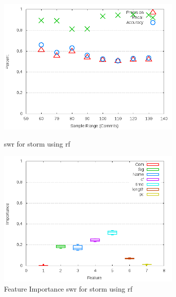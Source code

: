 \begin{figure}[!ht]
    \centering
        \includegraphics[width=0.8\textwidth]{images/rf/test_1/storm_sample_range}
        \caption{\gls{swr} for storm using \gls{rf}}
        \label{fig:test_1_storm_rf}

    \includegraphics[width=0.8\textwidth]{images/rf/test_1/storm_importance}
        \caption{Feature Importance \gls{swr} for storm using \gls{rf}}
        \label{fig:test_1_storm_rf_importance}
\end{figure}

